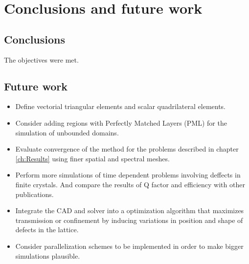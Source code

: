 \chapter{Conclusions and future work}

\section{Conclusions}
The objectives were met. 

\section{Future work}
\begin{itemize}
\item Define vectorial triangular elements and scalar quadrilateral elements.
\item Consider adding regions with Perfectly Matched Layers (PML) for the simulation of unbounded domains. 
\item Evaluate convergence of the method for the problems described in chapter \ref{ch:Results} using finer spatial and spectral meshes.
\item Perform more simulations of time dependent problems involving deffects in finite crystals. And compare the results of Q factor and efficiency with other publications.
\item Integrate the CAD and solver into a optimization algorithm that maximizes transmission or confinement by inducing variations in position and shape of defects in the lattice.
\item Consider parallelization schemes to be implemented in order to make bigger simulations plausible. 
\end{itemize}


